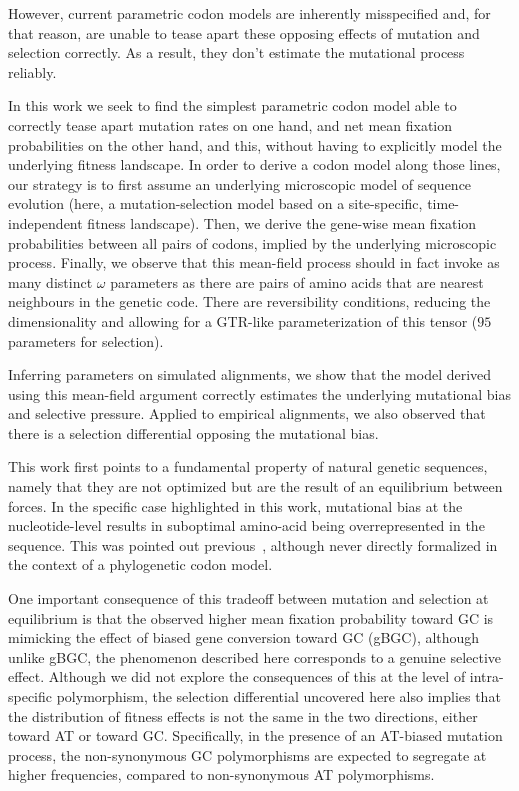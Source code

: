 However, current parametric codon models are inherently misspecified and, for that reason, are unable to tease apart these opposing effects of mutation and selection correctly.
As a result, they don’t estimate the mutational process reliably.

In this work we seek to find the simplest parametric codon model able to correctly tease apart mutation rates on one hand, and net mean fixation probabilities on the other hand, and this, without having to explicitly model the underlying fitness landscape.
In order to derive a codon model along those lines, our strategy is to first assume an underlying microscopic model of sequence evolution (here, a mutation-selection model based on a site-specific, time-independent fitness landscape).
Then, we derive the gene-wise mean fixation probabilities between all pairs of codons, implied by the underlying microscopic process.
Finally, we observe that this mean-field process should in fact invoke as many distinct $\omega$ parameters as there are pairs of amino acids that are nearest neighbours in the genetic code.
There are reversibility conditions, reducing the dimensionality and allowing for a GTR-like parameterization of this tensor ($95$ parameters for selection).

Inferring parameters on simulated alignments, we show that the model derived using this mean-field argument correctly estimates the underlying mutational bias and selective pressure.
Applied to empirical alignments, we also observed that there is a selection differential opposing the mutational bias.

This work first points to a fundamental property of natural genetic sequences, namely that they are not optimized but are the result of an equilibrium between forces.
In the specific case highlighted in this work, mutational bias at the nucleotide-level results in suboptimal amino-acid being overrepresented in the sequence.
This was pointed out previous~\citep{Singer2000}, although never directly formalized in the context of a phylogenetic codon model.

One important consequence of this tradeoff between mutation and selection at equilibrium is that the observed higher mean fixation probability toward GC is mimicking the effect of biased gene conversion toward GC (gBGC), although unlike gBGC, the phenomenon described here corresponds to a genuine selective effect.
Although we did not explore the consequences of this at the level of intra-specific polymorphism, the selection differential uncovered here also implies that the distribution of fitness effects is not the same in the two directions, either toward AT or toward GC.
Specifically, in the presence of an AT-biased mutation process, the non-synonymous GC polymorphisms are expected to segregate at higher frequencies, compared to non-synonymous AT polymorphisms.

